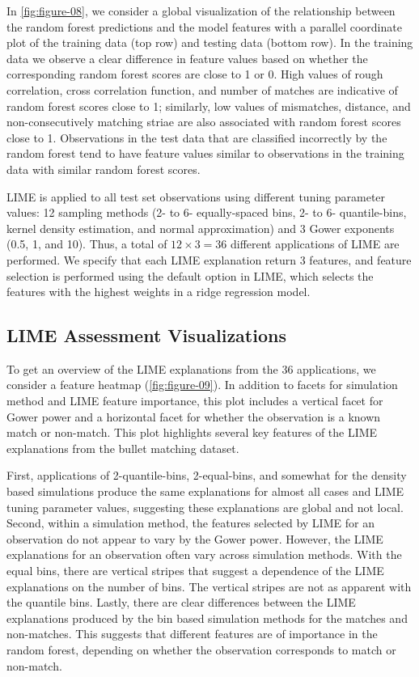 \documentclass[AMS,STIX2COL]{WileyNJD-v2}\usepackage[]{graphicx}\usepackage[]{color}
\begin{document}
In \autoref{fig:figure-08}, we consider a global visualization of the relationship between the random forest predictions and the model features with a parallel coordinate plot of the training data (top row) and testing data (bottom row). In the training data we observe a clear difference in feature values based on whether the corresponding random forest scores are close to 1 or 0. High values of rough correlation, cross correlation function, and number of matches are indicative of random forest scores close to 1; similarly, low values of mismatches, distance, and non-consecutively matching striae are also associated with random forest scores close to 1. Observations in the test data that are classified incorrectly by the random forest tend to have feature values similar to observations in the training data with similar random forest scores. 

LIME is applied to all test set observations using different tuning parameter values: 12 sampling methods (2- to 6- equally-spaced bins, 2- to 6- quantile-bins, kernel density estimation, and normal approximation) and 3 Gower exponents (0.5, 1, and 10). Thus, a total of $12\times 3=36$ different applications of LIME are performed. We specify that each LIME explanation return 3 features, and feature selection is performed using the default option in LIME, which selects the features with the highest weights in a ridge regression model.







\subsection{LIME Assessment Visualizations} \label{bullet-assess-ex}

To get an overview of the LIME explanations from the 36 applications, we consider a feature heatmap (\autoref{fig:figure-09}). In addition to facets for simulation method and LIME feature importance, this plot includes a vertical facet for Gower power and a horizontal facet for whether the observation is a known match or non-match. This plot highlights several key features of the LIME explanations from the bullet matching dataset.

First, applications of 2-quantile-bins, 2-equal-bins, and somewhat for the density based simulations produce the same explanations for almost all cases and LIME tuning parameter values, suggesting these explanations are global and not local. Second, within a simulation method, the features selected by LIME for an observation do not appear to vary by the Gower power. However, the LIME explanations for an observation often vary across simulation methods. With the equal bins, there are vertical stripes that suggest a dependence of the LIME explanations on the number of bins. The vertical stripes are not as apparent with the quantile bins. Lastly, there are clear differences between the LIME explanations produced by the bin based simulation methods for the matches and non-matches. This suggests that different features are of importance in the random forest, depending on whether the observation corresponds to match or non-match.
\end{document}
